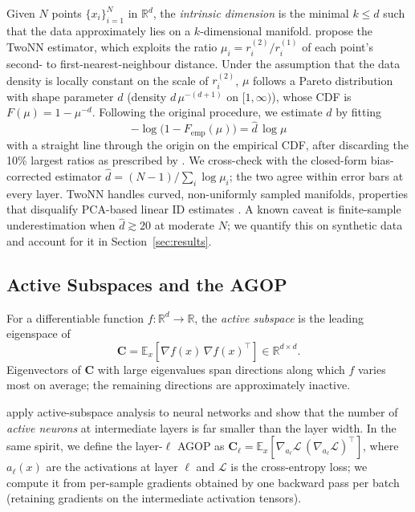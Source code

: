 \documentclass{article}
\newcommand{\R}{\mathbb{R}}
\newcommand{\E}{\mathbb{E}}
\newcommand{\AGOP}{\mathbf{C}}          %
\begin{document}
Given $N$ points $\{x_i\}_{i=1}^N$ in $\R^d$, the \emph{intrinsic dimension}
is the minimal $k \le d$ such that the data approximately lies on a
$k$-dimensional manifold.  \citet{facco2017estimating} propose the TwoNN
estimator, which exploits the ratio $\mu_i = r_i^{(2)}/r_i^{(1)}$ of each
point's second- to first-nearest-neighbour distance.  Under the assumption
that the data density is locally constant on the scale of $r_i^{(2)}$, $\mu$
follows a Pareto distribution with shape parameter $d$ (density
$d\,\mu^{-(d+1)}$ on $[1,\infty)$), whose CDF is $F(\mu) = 1 - \mu^{-d}$.
Following the original procedure, we estimate $d$ by fitting
\begin{equation}
-\log\bigl(1 - F_{\mathrm{emp}}(\mu)\bigr) = \hat{d}\,\log \mu
\label{eq:twonn}
\end{equation}
with a straight line through the origin on the empirical CDF, after
discarding the 10\% largest ratios as prescribed by
\citet{facco2017estimating}.  We cross-check with the closed-form
bias-corrected estimator $\hat d = (N{-}1)/\sum_i \log\mu_i$; the two agree
within error bars at every layer.  TwoNN handles curved, non-uniformly
sampled manifolds, properties that disqualify PCA-based linear ID estimates
\citep{ansuini2019intrinsic}.  A known caveat is finite-sample
underestimation when $\hat d \gtrsim 20$ at moderate $N$; we quantify this on
synthetic data and account for it in Section~\ref{sec:results}.

\subsection{Active Subspaces and the AGOP}
\label{sec:agop}

For a differentiable function $f:\R^d\to\R$, the \emph{active subspace}
\citep{constantine2015active} is the leading eigenspace of
\begin{equation}
\AGOP = \E_x\!\left[\nabla f(x)\,\nabla f(x)^\top\right] \in \R^{d\times d}.
\label{eq:agop}
\end{equation}
Eigenvectors of $\AGOP$ with large eigenvalues span directions along which $f$
varies most on average; the remaining directions are approximately inactive.

\citet{cui2020active} apply active-subspace analysis to neural networks and
show that the number of \emph{active neurons} at intermediate layers is far
smaller than the layer width.  In the same spirit, we define the layer-$\ell$
AGOP as $\AGOP_\ell =
\E_x[\nabla_{a_\ell}\mathcal{L}\,(\nabla_{a_\ell}\mathcal{L})^\top]$, where
$a_\ell(x)$ are the activations at layer $\ell$ and $\mathcal{L}$ is the
cross-entropy loss; we compute it from per-sample gradients obtained by one
backward pass per batch (retaining gradients on the intermediate activation
tensors).
\end{document}

